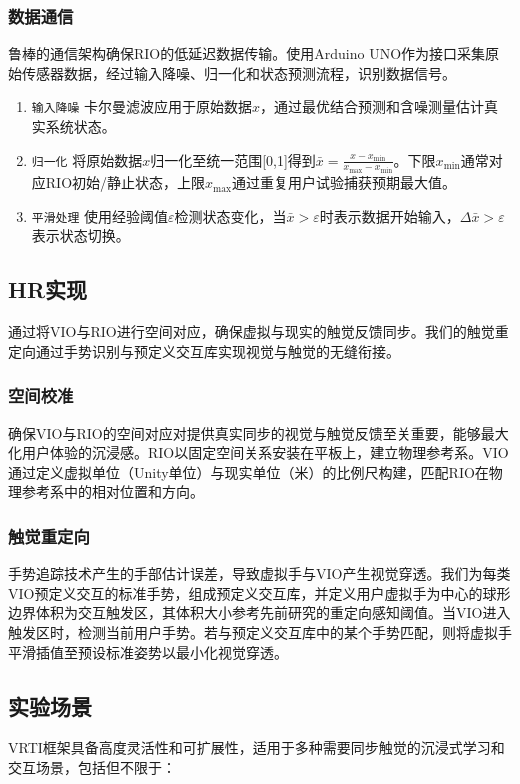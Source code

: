 \documentclass[runningheads]{llncs}
\begin{document}
\subsubsection{数据通信}
鲁棒的通信架构确保RIO的低延迟数据传输。使用Arduino UNO作为接口采集原始传感器数据，经过输入降噪、归一化和状态预测流程，识别数据信号。
\begin{enumerate}[label={\arabic*)}]
  \item \texttt{输入降噪} 卡尔曼滤波应用于原始数据$x$，通过最优结合预测和含噪测量估计真实系统状态。
  \item \texttt{归一化} 将原始数据$x$归一化至统一范围[0,1]得到$\bar{x}=\displaystyle\frac{x-x_{\min}}{x_{\max}-x_{\min}}$。下限$x_{\min}$通常对应RIO初始/静止状态，上限$x_{\max}$通过重复用户试验捕获预期最大值。
  \item \texttt{平滑处理} 使用经验阈值$\varepsilon$检测状态变化，当$\bar{x}>\varepsilon$时表示数据开始输入，$\Delta\bar{x}>\varepsilon$表示状态切换。
\end{enumerate}

\subsection{HR实现}
通过将VIO与RIO进行空间对应，确保虚拟与现实的触觉反馈同步。我们的触觉重定向通过手势识别与预定义交互库实现视觉与触觉的无缝衔接。

\subsubsection{空间校准}
确保VIO与RIO的空间对应对提供真实同步的视觉与触觉反馈至关重要，能够最大化用户体验的沉浸感。RIO以固定空间关系安装在平板上，建立物理参考系。VIO通过定义虚拟单位（Unity单位）与现实单位（米）的比例尺构建，匹配RIO在物理参考系中的相对位置和方向。

\subsubsection{触觉重定向}
手势追踪技术产生的手部估计误差，导致虚拟手与VIO产生视觉穿透。我们为每类VIO预定义交互的标准手势，组成预定义交互库，并定义用户虚拟手为中心的球形边界体积为交互触发区，其体积大小参考先前研究的重定向感知阈值。当VIO进入触发区时，检测当前用户手势。若与预定义交互库中的某个手势匹配，则将虚拟手平滑插值至预设标准姿势以最小化视觉穿透。


\subsection{实验场景}
VRTI框架具备高度灵活性和可扩展性，适用于多种需要同步触觉的沉浸式学习和交互场景，包括但不限于：
\end{document}
